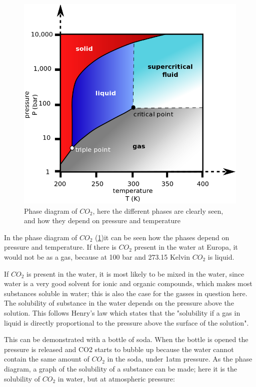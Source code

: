 \begin{figure}[htb]
  \centering
  \includegraphics[scale=0.4]{figures/GasDetectionAgge/CO2PhaseDiagram}
  \caption{Phase diagram of $CO_2$, here the different phases are clearly seen, and how they depend on pressure and temperature\cite{PhaseCO2}}
  \label{fig:PhaseDiagramCO2}
\end{figure}

In the phase diagram of $CO_2$ (\ref{fig:PhaseDiagramCO2})it can be seen how the phases depend on pressure and temperature. If there is $CO_2$ present in the water at Europa, it would not be as a gas, because at 100 bar and 273.15 Kelvin $CO_2$ is liquid.

If $CO_2$ is present in the water, it is most likely to be mixed in the water, since water is a very good solvent for ionic and organic compounds, which makes most substances soluble in water; this is also the case for the gasses in question here. The solubility of substance in the water depends on the pressure above the solution. This follows Henry's law which states that the "solubility if a gas in liquid is directly proportional to the pressure above the surface of the solution\cite{SolubilityOfGases}".

This can be demonstrated with a bottle of soda. When the bottle is opened the pressure is released and CO2 starts to bubble up because the water cannot contain the same amount of $CO_2$ in the soda, under 1atm pressure.
As the phase diagram, a graph of the solubility of a substance can be made; here it is the solubility of $CO_2$ in water, but at atmospheric pressure:

